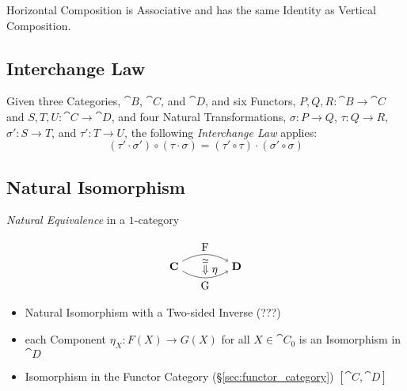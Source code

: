 Horizontal Composition is Associative and has the same Identity as
Vertical Composition.



\subsection{Interchange Law}\label{sec:interchange_law}

Given three Categories, $\cat{B}$, $\cat{C}$, and $\cat{D}$,
and six Functors, $P,Q,R : \cat{B} \rightarrow \cat{C}$ and
$S,T,U : \cat{C} \rightarrow \cat{D}$, and four Natural
Transformations, $\sigma : P \rightarrow Q$, $\tau : Q \rightarrow R$,
$\sigma' : S \rightarrow T$, and $\tau' : T \rightarrow U$, the
following \emph{Interchange Law} applies:
\[
  (\tau' \cdot \sigma') \circ (\tau \cdot \sigma) =
  (\tau' \circ \tau) \cdot (\sigma' \circ \sigma)
\]



\subsection{Natural Isomorphism}\label{sec:natural_isomorphism}

\emph{Natural Equivalence} in a $1$-category %

\[
  \begin{tikzpicture}
    \node (C) at (-1,0) {$\cat{C}$};
    \node (D) at (1,0) {$\cat{D}$};
    \node (N) at (0,0) {$\;\;\;\stackrel{\simeq}{\Downarrow}\eta$};
    \draw[->,bend left] (C) to node [above] {F} (D);
    \draw[->,bend right] (C) to node [below] {G} (D);
  \end{tikzpicture}
\]

\begin{itemize}
  \item Natural Isomorphism with a Two-sided Inverse (???)
  \item each Component $\eta_X : F(X) \rightarrow G(X)$ for all $X
    \in \cat{C}_0$ is an Isomorphism in $\cat{D}$
  \item Isomorphism in the Functor Category
    (\S\ref{sec:functor_category}) $[\cat{C},\cat{D}]$
\end{itemize}



